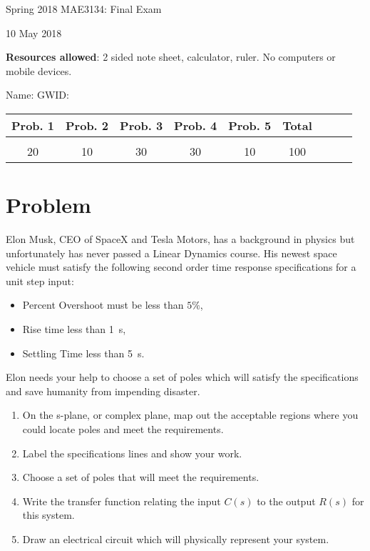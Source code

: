 \documentclass[titlepage, 11pt, reqno]{article}    %
\begin{document}
\begin{titlepage}
    \centering
    \vspace{1cm}
    {\Large Spring 2018 MAE3134: Final Exam\par }
    \vspace{3cm}
    {10 May 2018\par}
    \vspace{1cm}
    \textbf{Resources allowed}: 2 sided note sheet, calculator, ruler. 
    No computers or mobile devices.

    \vspace{1cm}
    {Name: \underline{\hspace{5cm}} \hspace{2cm} GWID:\underline{\hspace{5cm}}\par}
    \vspace{3cm}

    \begin{tabular}{|c|c|c|c|c|c|c|c|c|}
        \hline
        Prob. 1 & Prob. 2 & Prob. 3 & Prob. 4 & Prob. 5 & Total \\
        \hline
         & & & & &\\[4ex]
        \hline
        20 & 10 & 30 & 30 & 10 & 100 \\[4ex]
        \hline
    \end{tabular}
    \vfill
\end{titlepage}
\section{Problem}\label{prob:sys_response_to_poles}
Elon Musk, CEO of SpaceX and Tesla Motors, has a background in physics but unfortunately has never passed a Linear Dynamics course. 
His newest space vehicle must satisfy the following second order time response specifications for a unit step input:
\begin{itemize}
    \item Percent Overshoot must be less than \(5 \%\),
    \item Rise time less than \SI{1}{\second},
    \item Settling Time less than \SI{5}{\second}.
\end{itemize}
Elon needs your help to choose a set of poles which will satisfy the specifications and save humanity from impending disaster.
\begin{enumerate}
    \item On the s-plane, or complex plane, map out the acceptable regions where you could locate poles and meet the requirements. 
    \item Label the specifications lines and show your work.
    \item Choose a set of poles that will meet the requirements.
    \item Write the transfer function relating the input \( C(s) \) to the output \( R(s) \) for this system.
    \item Draw an electrical circuit which will physically represent your system.
\end{enumerate}
\end{document}
